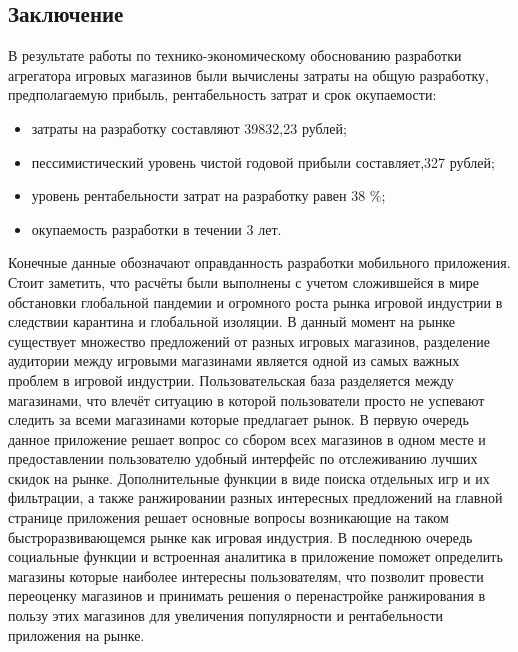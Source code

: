 \subsection{Заключение}
В результате работы по технико-экономическому обоснованию разработки агрегатора игровых магазинов были вычислены затраты на общую разработку, предполагаемую прибыль, рентабельность затрат и срок окупаемости:
\begin{itemize}
 \item затраты на разработку составляют 39832,23 рублей;
 \item пессимистический уровень чистой годовой прибыли составляет,327 рублей;
 \item уровень рентабельности затрат на разработку равен 38 \%;
 \item окупаемость разработки в течении 3 лет.
\end{itemize}
 Конечные данные обозначают оправданность разработки мобильного приложения. Стоит заметить, что расчёты были выполнены с учетом сложившейся в мире обстановки глобальной пандемии и огромного роста рынка игровой индустрии в следствии карантина и глобальной изоляции. В данный момент на рынке существует множество предложений от разных игровых магазинов, разделение аудитории между игровыми магазинами является одной из самых важных проблем в игровой индустрии. Пользовательская база разделяется между магазинами, что влечёт ситуацию в которой пользователи просто не успевают следить за всеми магазинами которые предлагает рынок. В первую очередь данное приложение решает вопрос со сбором всех магазинов в одном месте и предоставлении пользователю удобный интерфейс по отслеживанию лучших скидок на рынке. Дополнительные функции в виде поиска отдельных игр и их фильтрации, а также ранжировании разных интересных предложений на главной странице приложения решает основные вопросы возникающие на таком быстроразвивающемся рынке как игровая индустрия. В последнюю очередь социальные функции и встроенная аналитика в приложение поможет определить магазины которые наиболее интересны пользователям, что позволит провести переоценку магазинов и принимать решения о перенастройке ранжирования в пользу этих магазинов для увеличения популярности и рентабельности приложения на рынке.
 




